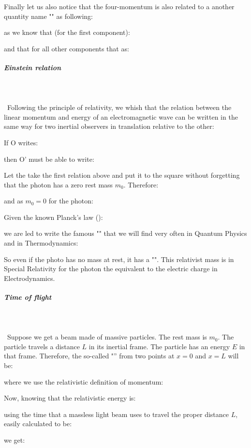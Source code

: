 	Finally let us also notice that the four-momentum is also related to a another quantity name "" as following:
	
	as we know that (for the first component):
	
	and that for all other components that as:
	
	
	\subparagraph{Einstein relation}\mbox{}\\\\\
	Following the principle of relativity, we whish that the relation between the linear momentum and energy of an electromagnetic wave can be written in the same way for two inertial observers in translation relative to the other:

	If O writes:
	
	then O' must be able to write:
	
	Let the take the first relation above and put it to the square without forgetting that the photon has a zero rest mass $m_0$. Therefore:
	
	and as $m_0=0$ for the photon:
	
	Given the known Planck's law ():
	
	we are led to write the famous "" that we will find very often in Quantum Physics and in Thermodynamics:
		
	So even if the photo has no mass at rest, it has a "". This relativist mass is in Special Relativity for the photon the equivalent to the electric charge in Electrodynamics.
	
	\subparagraph{Time of flight}\mbox{}\\\\\
	Suppose we get a beam made of massive particles. The rest mass  is $m_0$. The particle travels a distance $L$ in its inertial frame. The particle has an energy $E$ in that frame. Therefore, the so-called "” from two points at $x=0$ and $x=L$ will be:
	
 	where we use the relativistic definition of momentum:
	
	Now, knowing that the relativistic energy is:
	
	using the time that a massless light beam uses to travel the proper distance $L$, easily calculated to be:
	
	 we get:
 	
